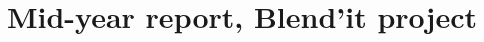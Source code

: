 \documentclass[a4paper,10pt]{article}
\title{Mid-year report, Blend'it project}
\author{}
\begin{document}
\maketitle

\tableofcontents




\begingroup




\endgroup
\end{document}

